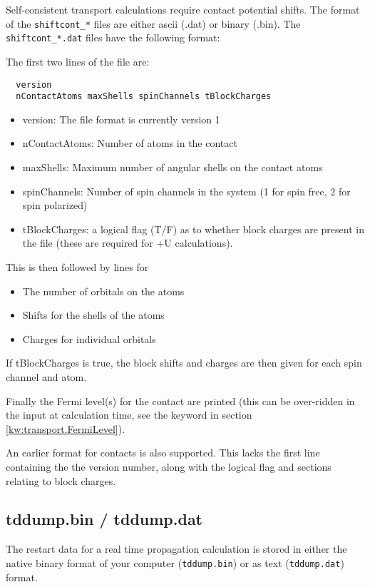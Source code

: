 Self-consistent transport calculations require contact potential shifts. The
format of the \verb|shiftcont_*| files are either ascii (.dat) or binary
(.bin). The \verb|shiftcont_*.dat| files have the following format:

The first two lines of the file are:
\begin{verbatim}
  version
  nContactAtoms maxShells spinChannels tBlockCharges
\end{verbatim}

\begin{itemize}
\item version: The file format is currently version 1
\item nContactAtoms: Number of atoms in the contact
\item maxShells: Maximum number of angular shells on the contact atoms
\item spinChannels: Number of spin channels in the system (1 for spin free, 2
  for spin polarized)
\item tBlockCharges: a logical flag (T/F) as to whether block charges are
  present in the file (these are required for +U calculations).
\end{itemize}
This is then followed by lines for
\begin{itemize}
\item The number of orbitals on the atoms
\item Shifts for the shells of the atoms
\item Charges for individual orbitals
\end{itemize}

If tBlockCharges is true, the block shifts and charges are then given for each
spin channel and atom.

Finally the Fermi level(s) for the contact are printed (this can be over-ridden
in the input at calculation time, see the  keyword in section
\ref{kw:transport.FermiLevel}).

An earlier format for contacts is also supported. This lacks the first line
containing the the version number, along with the logical flag and sections
relating to block charges.

\subsection{tddump.bin / tddump.dat}
\label{app:tddump}

The restart data for a real time propagation calculation is stored in either the
native binary format of your computer (\verb|tddump.bin|) or as text
(\verb|tddump.dat|) format.

